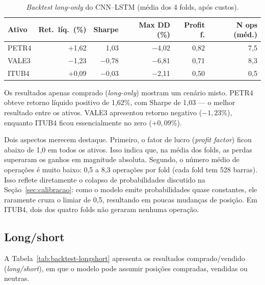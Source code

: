 \begin{table}[htbp]
  \centering
  \caption{\textit{Backtest} \textit{long-only} do CNN--LSTM (média dos 4 folds, após custos).}
  \label{tab:backtest-longonly}
  \begin{tabular}{l r r r r r}
    \toprule
    \textbf{Ativo} & \textbf{Ret.\ líq.\ (\%)} & \textbf{Sharpe} & \textbf{Max DD (\%)} & \textbf{Profit f.} & \textbf{N ops (méd.)} \\
    \midrule
    PETR4 & $+$1,62 & 1,03 & $-$4,02 & 0,82 & 7,5 \\
    VALE3 & $-$1,23 & $-$0,78 & $-$6,81 & 0,71 & 8,3 \\
    ITUB4 & $+$0,09 & $-$0,03 & $-$2,11 & 0,50 & 0,5 \\
    \bottomrule
  \end{tabular}
\end{table}

Os resultados apenas comprado (\textit{long-only}) mostram um cenário misto. PETR4 obteve retorno líquido
positivo de 1,62\%, com Sharpe de 1,03 --- o melhor resultado entre os ativos.
VALE3 apresentou retorno negativo ($-1{,}23$\%), enquanto ITUB4 ficou essencialmente no zero
($+0{,}09$\%).

Dois aspectos merecem destaque. Primeiro, o fator de lucro (\textit{profit factor}) ficou abaixo de 1,0 em todos
os ativos. Isso indica que, na média dos folds, as perdas superaram os ganhos em magnitude
absoluta. Segundo, o número médio de operações é muito baixo: 0,5 a 8,3 operações por fold
(cada fold tem 528 barras). Isso reflete diretamente o colapso de probabilidades discutido
na Seção~\ref{sec:calibracao}: como o modelo emite probabilidades quase constantes, ele raramente
cruza o limiar de 0,5, resultando em poucas mudanças de posição. Em ITUB4, dois dos quatro folds
não geraram nenhuma operação.

\subsection{Long/short}

A Tabela~\ref{tab:backtest-longshort} apresenta os resultados comprado/vendido (\textit{long/short}),
em que o modelo pode assumir posições compradas, vendidas ou neutras.

